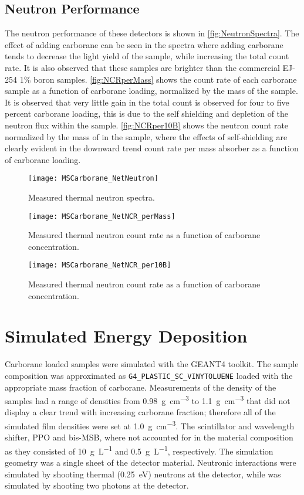 \documentclass[draftcls,onecolumn]{IEEEtran}
\begin{document}
\subsection{Neutron Performance}
The neutron performance of these detectors is shown in \autoref{fig:NeutronSpectra}.
The effect of adding carborane can be seen in the spectra where adding carborane tends to decrease the light yield of the sample, while increasing the total count rate.
It is also observed that these samples are brighter than the commercial EJ-254 1\% boron samples.
\autoref{fig:NCRperMass} shows the count rate of each carborane sample as a function of carborane loading, normalized by the mass of the sample. 
It is observed that very little gain in the total count is observed for four to five percent carborane loading, this is due to the self shielding and depletion of the neutron flux within the sample.
\autoref{fig:NCRper10B} shows the neutron count rate normalized by the mass of  in the sample, where the effects of self-shielding are clearly evident in the downward trend count rate per mass absorber as a function of carborane loading.
\begin{figure}
  \centering
  \texttt{[image: MSCarborane\_NetNeutron]}
  \caption[Measured Thermal Neutron Count Rate]{Measured thermal neutron spectra.}
  \label{fig:NeutronSpectra}
\end{figure}
\begin{figure}
  \centering
  \texttt{[image: MSCarborane\_NetNCR\_perMass]}
  \caption[Measured Thermal Neutron Count Rate]{Measured thermal neutron count rate as a function of carborane concentration. }
  \label{fig:NCRperMass}
\end{figure}
\begin{figure}
  \centering
  \texttt{[image: MSCarborane\_NetNCR\_per10B]}
  \caption[Measured Thermal Neutron Count Rate]{Measured thermal neutron count rate as a function of carborane concentration. }
  \label{fig:NCRper10B}
\end{figure}
\section{Simulated Energy Deposition}
Carborane loaded samples were simulated with the GEANT4 toolkit.
The sample composition was approximated as \verb+G4_PLASTIC_SC_VINYTOLUENE+ loaded with the appropriate mass fraction of carborane.
Measurements of the density of the samples had a range of densities from \SI{0.98}{\gram\per\cm\cubed} to \SI{1.1}{\gram\per\cm\cubed} that did not display a clear trend with increasing carborane fraction; therefore all of the simulated film densities were set at \SI{1.0}{\gram\per\cm\cubed}.
The scintillator and wavelength shifter, PPO and bis-MSB, where not accounted for in the material composition as they consisted of \SI{10}{\gram\per\liter} and  \SI{0.5}{\gram\per\liter}, respectively.
The simulation geometry was a single sheet of the detector material.
Neutronic interactions were simulated by shooting thermal (\SI{0.25}{\eV}) neutrons at the detector, while  was simulated by shooting two photons at the detector.
\end{document}
